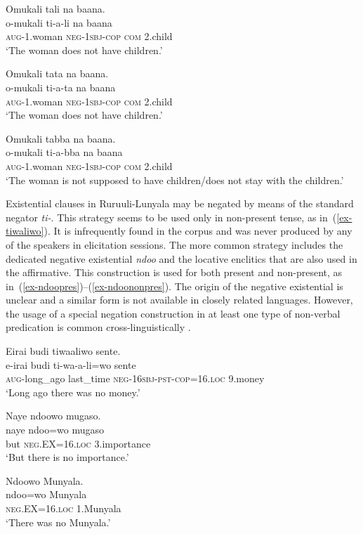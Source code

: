 \begin{xlist}
\ex \label{ex-ruuliposslineg}
	\glll Omukali tali na baana. \\
	  o-mukali ti-a-li na baana\\
		\textsc{aug}-1.woman \textsc{neg}-\textsc{1sbj}-\textsc{cop} \textsc{com} 2.child\\
\glt ‘The woman does not have children.’ 
	
	\ex \label{ex-ruuliposstaaneg}
	\glll Omukali tata na baana.\\
	  o-mukali ti-a-ta na baana\\
		\textsc{aug}-1.woman \textsc{neg}-\textsc{1sbj}-\textsc{cop} \textsc{com} 2.child\\
\glt ‘The woman does not have children.’

	\ex \label{ex-ruulipossbbaneg}
	\glll Omukali tabba na baana. \\
	  o-mukali ti-a-bba na baana\\
		\textsc{aug}-1.woman \textsc{neg}-\textsc{1sbj}-\textsc{cop} \textsc{com} 2.child\\
\glt ‘The woman is not supposed to have children/does not stay with the children.’ 	
\end{xlist}
\z

Existential clauses in Ru\-ruu\-li\hyp{}Lu\-nya\-la may be negated by means of the standard negator \textit{ti-}. This strategy  seems to be used only in non-present tense, as in~(\ref{ex-tiwaliwo}). 
It is infrequently found in the corpus and was never produced by any of the speakers in elicitation sessions. 
The more common strategy includes the dedicated negative existential \textit{ndoo} and the locative enclitics that are also used in the affirmative. 
This construction  is used for both present and non-present, as in~(\ref{ex-ndoopres})--(\ref{ex-ndoononpres}). 
The origin of the negative existential is unclear and a similar form is not available in closely related languages. 
However, the usage of a special negation construction in at least one type of non-verbal predication is common cross-linguistically \citep{Miestamo2017Negation}. 

\ea \label{ex-ruuliexistentialneg}
\begin{xlist}
	\ex \label{ex-tiwaliwo}
	\glll  Eirai budi tiwaaliwo sente.\\
	e-irai budi 			ti-wa-a-li=wo sente\\
		\textsc{aug}-long\_ago last\_time \textsc{neg}-1\textsc{6sbj}-\textsc{pst}-\textsc{cop}=16.\textsc{loc} 9.money\\
	\glt ‘Long ago there was no money.’ 	
	
\ex \label{ex-ndoopres}
	\glll Naye ndoowo mugaso.\\
		  naye ndoo=wo mugaso\\ 
		but \textsc{neg}.EX=16.\textsc{loc} 3.importance\\
	\glt ‘But there is no importance.’
	
\ex \label{ex-ndoononpres}
	\glll Ndoowo Munyala.\\
	  ndoo=wo Munyala\\
		\textsc{neg}.EX=16.\textsc{loc} 1.Munyala\\
	\glt ‘There was no Munyala.’
\end{xlist}
\z



